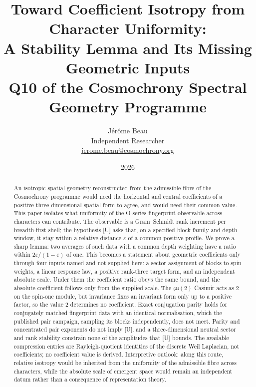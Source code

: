 \documentclass[12pt,a4paper]{article}
\theoremstyle{definition}
\theoremstyle{remark}
\begin{document}
  \title{%
    Toward Coefficient Isotropy from Character Uniformity:\\
    A Stability Lemma and Its Missing Geometric Inputs\\[0.4em]
    {\large Q10 of the Cosmochrony Spectral Geometry Programme}%
  }
  \author{J\'er\^ome Beau\\
  \small Independent Researcher\\
  \small \href{mailto:jerome.beau@cosmochrony.org}{jerome.beau@cosmochrony.org}
  }
  \date{2026}
  \maketitle

  \begin{abstract}
    An isotropic spatial geometry reconstructed from the admissible fibre of the Cosmochrony programme would need the
    horizontal and central coefficients of a positive three-dimensional spatial form to agree, and would need their
    common value.
    This paper isolates what uniformity of the O-series fingerprint observable across characters can contribute.
    The observable is a Gram--Schmidt rank increment per breadth-first shell; the hypothesis [U] asks that, on a
    specified block family and depth window, it stay within a relative distance $\varepsilon$ of a common positive
    profile.
    We prove a sharp lemma: two averages of such data with a common depth weighting have a ratio within
    $2\varepsilon/(1-\varepsilon)$ of one.
    This becomes a statement about geometric coefficients only through four inputs named and not supplied here: a
    sector assignment of blocks to spin weights, a linear response law, a positive rank-three target form, and an
    independent absolute scale.
    Under them the coefficient ratio obeys the same bound, and the absolute coefficient follows only from the
    supplied scale.
    The $\mathfrak{su}(2)$ Casimir acts as 2 on the spin-one module, but invariance fixes an invariant form only up
    to a positive factor, so the value 2 determines no coefficient.
    Exact conjugation parity holds for conjugately matched fingerprint data with an identical normalisation, which
    the published pair campaign, sampling its blocks independently, does not meet.
    Parity and concentrated pair exponents do not imply [U], and a three-dimensional neutral sector and rank
    stability constrain none of the amplitudes that [U] bounds.
    The available compression entries are Rayleigh-quotient identities of the discrete Weil Laplacian, not
    coefficients; no coefficient value is derived.
    Interpretive outlook: along this route, relative isotropy would be inherited from the uniformity of the
    admissible fibre across characters, while the absolute scale of emergent space would remain an independent
    datum rather than a consequence of representation theory.
  \end{abstract}
\end{document}

